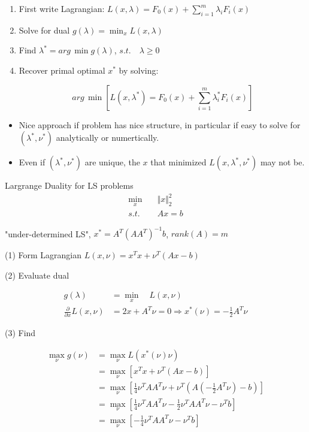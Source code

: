 \begin{enumerate}
	\item First write Lagrangian: $L(x, \lambda) = F_0(x) + \sum^m_{i=1}\lambda_iF_i(x)$
	
	\item Solve for dual $g(\lambda) = \min_{x} L(x, \lambda)$
	
	\item Find $\lambda^* = arg\, \min g(\lambda)$, $s.t. \quad \lambda \geq 0$
	
	\item Recover primal optimal $x^*$ by solving:
	
	\begin{equation*}
	arg\, \min[L(x, \lambda^*) = F_0(x) + \sum^m_{i=1}\lambda_i^*F_i(x)]
	\end{equation*}
\end{enumerate}

\begin{itemize}
	\item Nice approach if problem has nice structure, in particular if easy to solve for $(\lambda^*, \nu^*)$ analytically or numertically. 
	
	\item Even if $(\lambda^*, \nu^*)$ are unique, the $x$ that minimized $L(x, \lambda^*, \nu^*)$ may not be.
\end{itemize}



\begin{example}
	Largrange Duality for LS problems
	\begin{align*}
	\min_x \quad &\Vert x \Vert_2^2\\
	s.t.\quad &Ax = b
	\end{align*}
	
	"under-determined LS", $x^* = A^T(AA^T)^{-1}b$, $rank(A) = m$
	
	(1) Form Lagrangian $L(x, \nu) = x^Tx + \nu^T(Ax - b)$
	
	
	(2) Evaluate dual
	
	\begin{align*}
	g(\lambda) &= \min_x \quad L(x, \nu)\\
	\frac{\partial}{\partial x} L(x, \nu) &= 2x+A^T\nu = 0\Rightarrow x^*(\nu) = -\frac{1}{2}A^T\nu
	\end{align*}
	
	
	(3) Find
	
	
	\begin{align*}
	\max_{\nu} g(\nu) &= \max_{\nu} L(x^*(\nu)\nu)\\
	&= \max_{\nu}[x^Tx + \nu^T(Ax - b)]\\
	&= \max_{\nu}[\frac{1}{4}\nu^TAA^T\nu + \nu^T(A(-\frac{1}{2}A^T\nu)-b)]\\
	&= \max_{\nu}[\frac{1}{4}\nu^TAA^T\nu - \frac{1}{2}\nu^TAA^T\nu - \nu^Tb]\\
	&= \max_{\nu}[-\frac{1}{4}\nu^TAA^T\nu - \nu^Tb]
	\end{align*}
\end{example}

